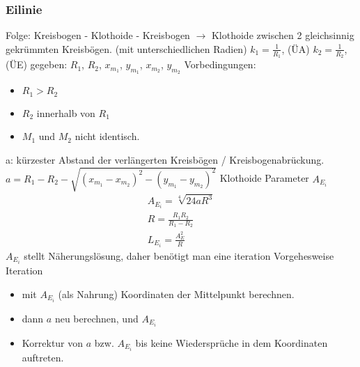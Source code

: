 \documentclass[12pt]{article}
\begin{document}
\subsubsection{Eilinie}
Folge: Kreisbogen - Klothoide - Kreisbogen \newline
$\longrightarrow$ Klothoide zwischen 2 gleichsinnig gekrümmten Kreisbögen. (mit unterschiedlichen Radien) \newline
$k_1 = \frac{1}{R_1}$, (ÜA) \newline 
$k_2 = \frac{1}{R_2}$, (ÜE) \newline
gegeben: $R_1$, $R_2$, $x_{m_1}$, $y_{m_1}$, $x_{m_2}$, $y_{m_2}$ \newline
Vorbedingungen:
\begin{itemize}
\item $R_1 > R_2$ 
\item $R_2$ innerhalb von $R_1$
\item $M_1$ und $M_2$ nicht identisch.
\end{itemize}
a: kürzester Abstand der verlängerten Kreisbögen / Kreisbogenabrückung. \newline
$a = R_1 - R_2 - \sqrt{(x_{m_1} - x_{m_2})^2 - (y_{m_1} - y_{m_2})^2}$ \newline
Klothoide Parameter $A_{E_i}$ \newline
\begin{gather*}
A_{E_i} = \sqrt[4]{24aR^3} \\
R = \frac{R_1 R_2}{R_1 - R_2} \\
L_{E_i} = \frac{A_E^2}{R}
\end{gather*}
$A_{E_i}$ stellt Näherungslösung, daher benötigt man eine iteration Vorgehesweise \newline
Iteration
\begin{itemize}
\item mit $A_{E_i}$ (als Nahrung) Koordinaten der Mittelpunkt berechnen. 
\item dann $a$ neu berechnen, und $A_{E_i}$
\item Korrektur von $a$ bzw. $A_{E_i}$ bis keine Wiedersprüche in dem Koordinaten auftreten.
\end{itemize}
\end{document}
